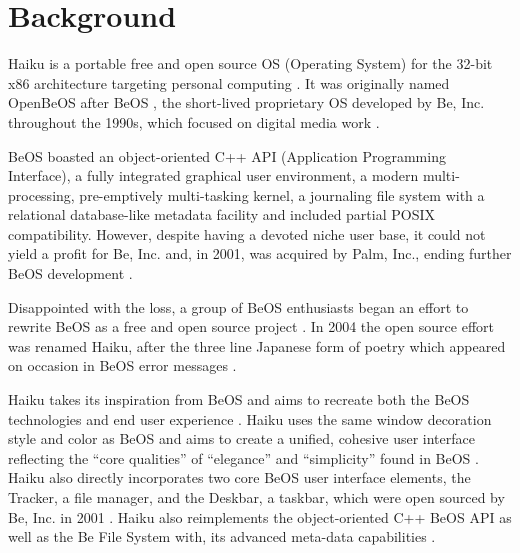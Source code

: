 \documentclass{article}
\begin{document}
\maketitle

\section{Background}

Haiku is a portable \cite{HaikuFaq} free and open source
\cite{HaikuDevFaq} OS (Operating System) for the 32-bit x86 architecture
\cite{HaikuFaq} targeting personal computing \cite{HaikuAbout}.  It
was originally named OpenBeOS after BeOS \cite{HaikuWiki}, the
short-lived proprietary OS developed by Be, Inc. throughout the 1990s,
which focused on digital media work
\cite{BeosWiki}.

BeOS boasted an object-oriented C++ API (Application Programming
Interface), a fully integrated graphical user environment, a modern
multi-processing, pre-emptively multi-tasking kernel, a journaling
file system with a relational database-like metadata
facility \cite{BFSWiki} and included partial POSIX compatibility.
However, despite having a devoted niche user base, it could not yield
a profit for Be, Inc. and, in 2001, was acquired by Palm, Inc., ending
further BeOS development \cite{BeosWiki}.

Disappointed with the loss, a group of BeOS enthusiasts began an
effort to rewrite BeOS as a free and open source project
\cite{BeosWiki, HaikuHistoryWiki}.  In 2004 the open source effort was
renamed Haiku, after the three line Japanese form of poetry which
appeared on occasion in BeOS error messages \cite{HaikuFaq,
HaikuHistoryWiki}.

Haiku takes its inspiration from BeOS \cite{HaikuAbout} and aims to
recreate both the BeOS technologies and end user experience
\cite{HaikuFaq}.  Haiku uses the same window decoration style and
color as BeOS \cite{HaikuWiki, BeosWiki} and aims to create a
unified, cohesive user interface \cite{HaikuAbout, HaikuHIG,
HaikuIcon} reflecting the ``core qualities'' of ``elegance'' and
``simplicity'' found in BeOS \cite{HaikuFaq}.  Haiku also directly
incorporates two core BeOS user interface elements, the Tracker, a
file manager, and the Deskbar, a taskbar, which were open sourced by
Be, Inc. in 2001 \cite{HaikuFaq}.  Haiku also reimplements the
object-oriented C++ BeOS API\cite{HaikuWiki} as well as the Be File
System with, its advanced meta-data capabilities \cite{BFSWiki}.
\end{document}
